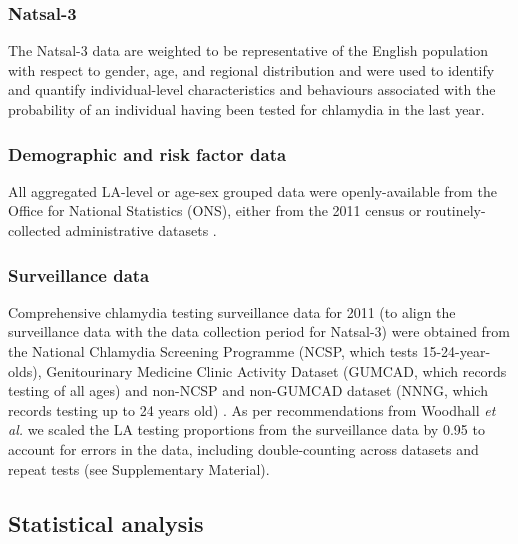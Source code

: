 \documentclass[fleqn,10pt]{wlscirep}
\begin{document}
\subsubsection*{Natsal-3}
The Natsal-3 data are weighted to be representative of the English population with respect to gender, age, and regional distribution \cite{Mercer2013,Erens2013} and were used to identify and quantify individual-level characteristics and behaviours associated with the probability of an individual having been tested for chlamydia in the last year.

\subsubsection*{Demographic and risk factor data}
All aggregated LA-level or age-sex grouped data were openly-available from the Office for National Statistics (ONS), either from the 2011 census \cite{OfficeforNationalStatistics2011} or routinely-collected administrative datasets \cite{OfficeforNationalStatistics2011a,DepartmentforCommunitiesandLocalGovernment}.

\subsubsection*{Surveillance data}
Comprehensive chlamydia testing surveillance data for 2011 (to align the surveillance data with the data collection period for Natsal-3) were obtained from the National Chlamydia Screening Programme (NCSP, which tests 15-24-year-olds), Genitourinary Medicine Clinic Activity Dataset (GUMCAD, which records testing of all ages) and non-NCSP and non-GUMCAD dataset (NNNG, which records testing up to 24 years old) \cite{PublicHealthEngland}. As per recommendations from Woodhall {\it et al.} \cite{Woodhall2013} we scaled the LA testing proportions from the surveillance data by 0.95 to account for errors in the data, including double-counting across datasets and repeat tests (see Supplementary Material).

\subsection*{Statistical analysis}
\end{document}
